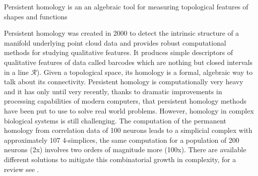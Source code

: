 \documentclass[onecollarge,runningheads]{svjour2}
\begin{document}

\begin{definition}
Persistent homology is an an algebraic tool for measuring topological features of shapes and functions
\end{definition}

Persistent homology was created in 2000 to detect the intrinsic structure of a manifold underlying point cloud data and provides robust computational methods for studying qualitative features. It produces simple descriptors of qualitative features of data called barcodes which are nothing but closed intervals in a line $\mathcal{R}$). Given a topological space, its homology is a formal, algebraic way to talk about its connectivity.
Persistent homology is computationally very heavy and it has only until very recently, thanks to dramatic improvements in processing capabilities of modern computers, that persistent homology methods have been put to use to solve real world problems.
However, homology in complex biological systems is still challenging. The computation of the permanent homology from correlation data of 100 neurons leads to a simplicial complex with approximately 107 4-simplices, the same computation for a population of 200 neurons (2x) involves two orders of magnitude more (100x).
There are available different solutions to mitigate this combinatorial growth in complexity, for a review see \cite{otter2015roadmap}.

\end{document}
